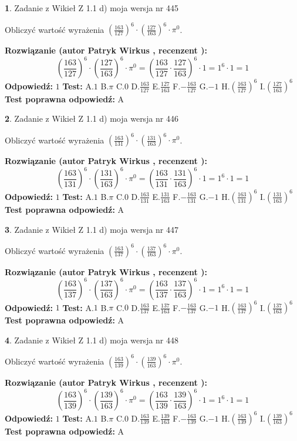 \documentclass[12pt, a4paper]{article}
\theoremstyle{definition} %
\newtheorem{zad}{}
\newcommand{\zadStart}[1]{\begin{zad}#1\newline}
\newcommand{\zadStop}{\end{zad}}
\newcommand{\rozwStart}[2]{\noindent \textbf{Rozwiązanie (autor #1 , recenzent #2): }\newline}
\newcommand{\rozwStop}{\newline}
\newcommand{\odpStart}{\noindent \textbf{Odpowiedź:}\newline}
\newcommand{\odpStop}{\newline}
\newcommand{\testStart}{\noindent \textbf{Test:}\newline}
\newcommand{\testStop}{\newline}
\newcommand{\kluczStart}{\noindent \textbf{Test poprawna odpowiedź:}\newline}
\newcommand{\kluczStop}{\newline}
\begin{document}
\zadStart{Zadanie z Wikieł Z 1.1 d) moja wersja nr 445}

Obliczyć wartość wyrażenia $(\frac{163}{127})^{6} \cdot (\frac{127}{163})^{6} \cdot \pi^{0}$.
\zadStop
\rozwStart{Patryk Wirkus}{}
$$(\frac{163}{127})^{6} \cdot (\frac{127}{163})^{6} \cdot \pi^{0} = (\frac{163}{127} \cdot \frac{127}{163})^{6} \cdot 1 = 1^{6} \cdot 1 = 1$$
\rozwStop
\odpStart
$1$
\odpStop
\testStart
A.$1$ B.$\pi$ C.$0$ D.$\frac{163}{127}$ E.$\frac{127}{163}$
F.$-\frac{163}{127}$ G.$-1$
H.$(\frac{163}{127})^{6}$
I.$(\frac{127}{163})^{6}$
\testStop
\kluczStart
A
\kluczStop



\zadStart{Zadanie z Wikieł Z 1.1 d) moja wersja nr 446}

Obliczyć wartość wyrażenia $(\frac{163}{131})^{6} \cdot (\frac{131}{163})^{6} \cdot \pi^{0}$.
\zadStop
\rozwStart{Patryk Wirkus}{}
$$(\frac{163}{131})^{6} \cdot (\frac{131}{163})^{6} \cdot \pi^{0} = (\frac{163}{131} \cdot \frac{131}{163})^{6} \cdot 1 = 1^{6} \cdot 1 = 1$$
\rozwStop
\odpStart
$1$
\odpStop
\testStart
A.$1$ B.$\pi$ C.$0$ D.$\frac{163}{131}$ E.$\frac{131}{163}$
F.$-\frac{163}{131}$ G.$-1$
H.$(\frac{163}{131})^{6}$
I.$(\frac{131}{163})^{6}$
\testStop
\kluczStart
A
\kluczStop



\zadStart{Zadanie z Wikieł Z 1.1 d) moja wersja nr 447}

Obliczyć wartość wyrażenia $(\frac{163}{137})^{6} \cdot (\frac{137}{163})^{6} \cdot \pi^{0}$.
\zadStop
\rozwStart{Patryk Wirkus}{}
$$(\frac{163}{137})^{6} \cdot (\frac{137}{163})^{6} \cdot \pi^{0} = (\frac{163}{137} \cdot \frac{137}{163})^{6} \cdot 1 = 1^{6} \cdot 1 = 1$$
\rozwStop
\odpStart
$1$
\odpStop
\testStart
A.$1$ B.$\pi$ C.$0$ D.$\frac{163}{137}$ E.$\frac{137}{163}$
F.$-\frac{163}{137}$ G.$-1$
H.$(\frac{163}{137})^{6}$
I.$(\frac{137}{163})^{6}$
\testStop
\kluczStart
A
\kluczStop



\zadStart{Zadanie z Wikieł Z 1.1 d) moja wersja nr 448}

Obliczyć wartość wyrażenia $(\frac{163}{139})^{6} \cdot (\frac{139}{163})^{6} \cdot \pi^{0}$.
\zadStop
\rozwStart{Patryk Wirkus}{}
$$(\frac{163}{139})^{6} \cdot (\frac{139}{163})^{6} \cdot \pi^{0} = (\frac{163}{139} \cdot \frac{139}{163})^{6} \cdot 1 = 1^{6} \cdot 1 = 1$$
\rozwStop
\odpStart
$1$
\odpStop
\testStart
A.$1$ B.$\pi$ C.$0$ D.$\frac{163}{139}$ E.$\frac{139}{163}$
F.$-\frac{163}{139}$ G.$-1$
H.$(\frac{163}{139})^{6}$
I.$(\frac{139}{163})^{6}$
\testStop
\kluczStart
A
\kluczStop
\end{document}
